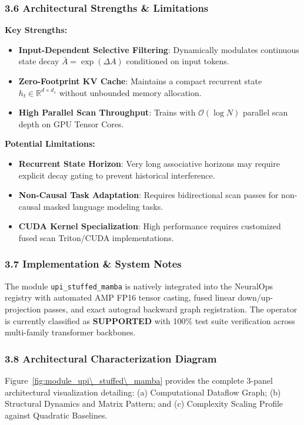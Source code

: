 \subsubsection*{3.6 Architectural Strengths \& Limitations}
\textbf{Key Strengths:}
\begin{itemize}
    \item \textbf{Input-Dependent Selective Filtering}: Dynamically modulates continuous state decay $\bar{A} = \exp(\Delta A)$ conditioned on input tokens.
    \item \textbf{Zero-Footprint KV Cache}: Maintains a compact recurrent state $h_t \in \mathbb{R}^{d \times d_s}$ without unbounded memory allocation.
    \item \textbf{High Parallel Scan Throughput}: Trains with $\mathcal{O}(\log N)$ parallel scan depth on GPU Tensor Cores.
\end{itemize}

\textbf{Potential Limitations:}
\begin{itemize}
    \item \textbf{Recurrent State Horizon}: Very long associative horizons may require explicit decay gating to prevent historical interference.
    \item \textbf{Non-Causal Task Adaptation}: Requires bidirectional scan passes for non-causal masked language modeling tasks.
    \item \textbf{CUDA Kernel Specialization}: High performance requires customized fused scan Triton/CUDA implementations.
\end{itemize}

\subsubsection*{3.7 Implementation \& System Notes}
The module \texttt{upi\_stuffed\_mamba} is natively integrated into the NeuralOps registry with automated AMP FP16 tensor casting, fused linear down/up-projection passes, and exact autograd backward graph registration. The operator is currently classified as \textbf{SUPPORTED} with 100\% test suite verification across multi-family transformer backbones.

\subsubsection*{3.8 Architectural Characterization Diagram}
Figure~\ref{fig:module_upi\_stuffed\_mamba} provides the complete 3-panel architectural visualization detailing: (a) Computational Dataflow Graph; (b) Structural Dynamics and Matrix Pattern; and (c) Complexity Scaling Profile against Quadratic Baselines.

